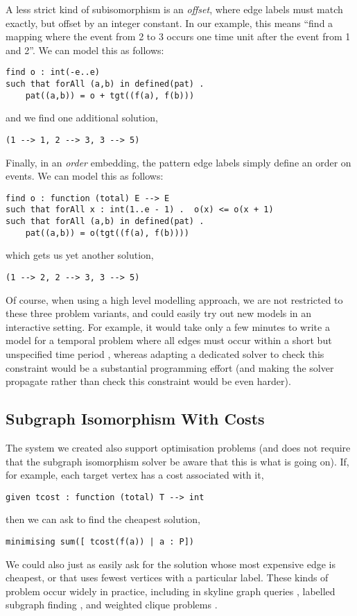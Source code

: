 \documentclass[runningheads]{llncs}
\begin{document}
A less strict kind of subisomorphism is an \emph{offset}, where edge labels must match exactly, but
offset by an integer constant. In our example, this means ``find a mapping where the event from 2
to 3 occurs one time unit after the event from 1 and 2''. We can model this as follows:
\begin{lstlisting}
find o : int(-e..e)
such that forAll (a,b) in defined(pat) .
    pat((a,b)) = o + tgt((f(a), f(b)))
\end{lstlisting}
and we find one additional solution,
\begin{lstlisting}
(1 --> 1, 2 --> 3, 3 --> 5)
\end{lstlisting}

Finally, in an \emph{order} embedding, the pattern edge labels simply define an order on events. We
can model this as follows:
\begin{lstlisting}
find o : function (total) E --> E
such that forAll x : int(1..e - 1) .  o(x) <= o(x + 1)
such that forAll (a,b) in defined(pat) .
    pat((a,b)) = o(tgt((f(a), f(b))))
\end{lstlisting}
which gets us yet another solution,
\begin{lstlisting}
(1 --> 2, 2 --> 3, 3 --> 5)
\end{lstlisting}

Of course, when using a high level modelling approach, we are not restricted to these three problem
variants, and could easily try out new models in an interactive setting. For example, it would take
only a few minutes to write a model for a temporal problem where all edges must occur within a short
but unspecified time period \cite{DBLP:conf/asunam/RedmondC13}, whereas adapting a dedicated solver
to check this constraint would be a substantial programming effort (and making the solver propagate
rather than check this constraint would be even harder).

\subsection{Subgraph Isomorphism With Costs}

The system we created also support optimisation problems (and does not require that the subgraph
isomorphism solver be aware that this is what is going on). If, for example, each target vertex has
a cost associated with it,
\begin{lstlisting}
given tcost : function (total) T --> int
\end{lstlisting}
then we can ask to find the cheapest solution,
\begin{lstlisting}
minimising sum([ tcost(f(a)) | a : P])
\end{lstlisting}
We could also just as easily ask for the solution whose most expensive edge is cheapest, or that
uses fewest vertices with a particular label. These kinds of problem occur widely in practice,
including in skyline graph queries \cite{DBLP:journals/pvldb/PandeR017}, labelled subgraph finding
\cite{DBLP:conf/colognetwente/DellOlmoCC11}, and weighted clique problems
\cite{DBLP:conf/cp/McCreeshPST17}.
\end{document}

